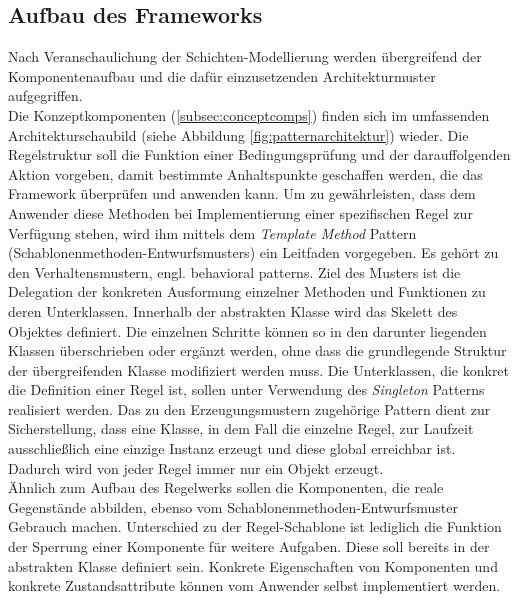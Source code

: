     \subsection{Aufbau des Frameworks}
        Nach Veranschaulichung der Schichten-Modellierung werden übergreifend der Komponentenaufbau und die dafür einzusetzenden Architekturmuster aufgegriffen. 
        \\
        Die Konzeptkomponenten (\ref{subsec:conceptcomps}) finden sich im umfassenden Architekturschaubild (siehe Abbildung \ref{fig:patternarchitektur}) wieder. 
        Die Regelstruktur soll die Funktion einer Bedingungsprüfung und der darauffolgenden Aktion vorgeben, damit bestimmte Anhaltspunkte geschaffen werden, die das Framework überprüfen 
        und anwenden kann. Um zu gewährleisten, dass dem Anwender diese Methoden bei Implementierung einer spezifischen Regel zur Verfügung stehen, wird ihm mittels dem 
        \textit{Template Method} Pattern \cite{gamma1995template} (Schablonenmethoden-Entwurfsmusters) ein Leitfaden vorgegeben. Es gehört zu den Verhaltensmustern, engl. behavioral patterns. 
        Ziel des Musters ist die Delegation der konkreten Ausformung einzelner Methoden und Funktionen zu deren Unterklassen. Innerhalb der 
        abstrakten Klasse wird das Skelett des Objektes definiert. Die einzelnen Schritte können so in den darunter liegenden Klassen überschrieben oder ergänzt 
        werden, ohne dass die grundlegende Struktur der übergreifenden Klasse modifiziert werden muss. Die Unterklassen, die konkret die Definition einer Regel ist, sollen 
        unter Verwendung des \textit{Singleton} Patterns \cite{gamma1995singleton} realisiert werden. Das zu den Erzeugungsmustern 
        zugehörige Pattern dient zur 
        Sicherstellung, dass eine Klasse, in dem Fall die einzelne Regel, zur Laufzeit ausschließlich eine einzige Instanz erzeugt und diese global erreichbar ist. 
        Dadurch wird von jeder Regel immer nur ein Objekt erzeugt. 
        \\
        \linebreak
        Ähnlich zum Aufbau des Regelwerks sollen die Komponenten, die reale Gegenstände abbilden, ebenso vom Schablonenmethoden-Entwurfsmuster Gebrauch machen. 
        Unterschied zu der Regel-Schablone ist lediglich die Funktion der Sperrung einer Komponente für weitere Aufgaben. Diese soll bereits in der abstrakten Klasse 
        definiert sein. Konkrete Eigenschaften von Komponenten und konkrete Zustandsattribute können vom Anwender selbst implementiert werden.
        \\
